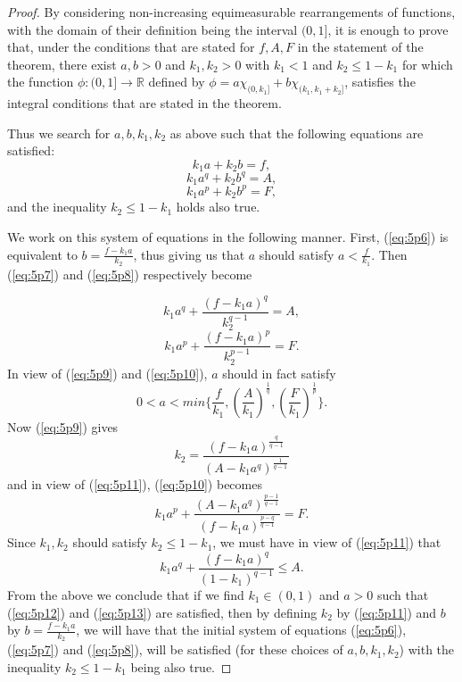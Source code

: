 \documentclass{article}
\numberwithin{equation}{section}
\theoremstyle{definition}
\theoremstyle{remark}
\begin{document}
\begin{proof}
By considering non-increasing equimeasurable rearrangements of functions, with the domain of their definition being the interval $(0,1]$, it is enough to prove that, under the conditions that are stated for $f, A, F$ in the statement of the theorem, there exist $a, b>0$ and $k_1, k_2>0$ with $k_1<1$ and $k_2\leq 1-k_1$ for which the function $\phi:(0,1]\rightarrow \mathbb{R}$ defined by $\phi=a\chi_{(0,k_1]}+b\chi_{(k_1,k_1+k_2]}$, satisfies the integral conditions that are stated in the theorem.

Thus we search for $a,b,k_1,k_2$ as above such that the following equations are satisfied:
\begin{equation}\label{eq:5p6}
k_1a+k_2b=f,
\end{equation}
\begin{equation}\label{eq:5p7}
k_1a^q+k_2b^q=A,
\end{equation}
\begin{equation}\label{eq:5p8}
k_1a^p+k_2b^p=F,
\end{equation}
and the inequality $k_2\leq 1-k_1$ holds also true.

We work on this system of equations in the following manner.
First, (\ref{eq:5p6}) is equivalent to $b=\frac{f-k_1a}{k_2}$, thus giving us that $a$ should satisfy $a<\frac{f}{k_1}$. Then (\ref{eq:5p7}) and (\ref{eq:5p8}) respectively become

\begin{equation}\label{eq:5p9}
k_1a^q+\frac{(f-k_1a)^q}{k_2^{q-1}}=A,
\end{equation}
\begin{equation}\label{eq:5p10}
k_1a^p+\frac{(f-k_1a)^p}{k_2^{p-1}}=F.
\end{equation}
In view of (\ref{eq:5p9}) and (\ref{eq:5p10}), $a$ should in fact satisfy
$$0<a<min\{ \frac{f}{k_1},(\frac{A}{k_1})^{\frac{1}{q}}, (\frac{F}{k_1})^{\frac{1}{p}} \}.$$
Now (\ref{eq:5p9}) gives
\begin{equation}\label{eq:5p11}
k_2=\frac{(f-k_1a)^\frac{q}{q-1}}{(A-k_1a^q)^\frac{1}{q-1}}
\end{equation}
and in view of (\ref{eq:5p11}), (\ref{eq:5p10}) becomes
\begin{equation}\label{eq:5p12}
k_1a^p+\frac{(A-k_1a^q)^\frac{p-1}{q-1}}{(f-k_1a)^\frac{p-q}{q-1}}=F.
\end{equation}
Since $k_1,k_2$ should satisfy $k_2\leq 1-k_1$, we must have in view of 
(\ref{eq:5p11}) that
\begin{equation}\label{eq:5p13}
k_1a^q+\frac{(f-k_1a)^q}{(1-k_1)^{q-1}}\leq A.
\end{equation}
From the above we conclude that if we find $k_1 \in (0,1)$ and $a>0$ such that (\ref{eq:5p12}) and (\ref{eq:5p13}) are satisfied, then by defining $k_2$ by (\ref{eq:5p11}) and $b$ by $b=\frac{f-k_1a}{k_2}$, we will have that the initial system of equations (\ref{eq:5p6}), (\ref{eq:5p7}) and (\ref{eq:5p8}), will be satisfied (for these choices of $a,b,k_1,k_2$) with the inequality $k_2\leq 1-k_1$ being also true.


\end{proof}
\end{document}
